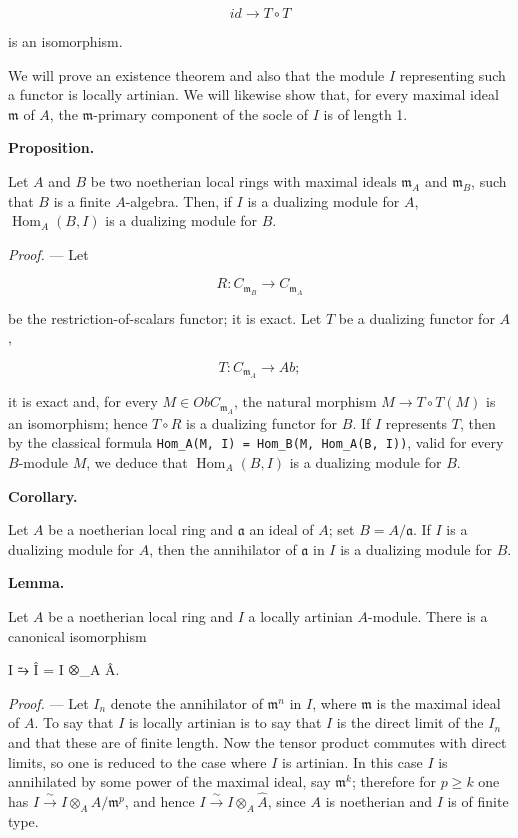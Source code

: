 \documentclass[
]{article}
\newenvironment{Shaded}{}{}
\newcommand{\NormalTok}[1]{#1}
\begin{document}
\[
id \longrightarrow T \circ T
\]

is an isomorphism.

We will prove an existence theorem and also that the module \(I\)
representing such a functor is locally artinian. We will likewise show
that, for every maximal ideal \(\mathfrak{m}\) of \(A\), the
\(\mathfrak{m}\)-primary component of the socle of \(I\) is of length 1.

\textbf{Proposition.}

Let \(A\) and \(B\) be two noetherian local rings with maximal ideals
\(\mathfrak{m}_{A}\) and \(\mathfrak{m}_{B}\), such that \(B\) is a
finite \(A\)-algebra. Then, if \(I\) is a dualizing module for \(A\),
\(\operatorname{Hom}_{A}(B, I)\) is a dualizing module for \(B\).

\emph{Proof.} --- Let

\[
R : C_{\mathfrak{m}_{B}} \longrightarrow C_{\mathfrak{m}_{A}}
\]

be the restriction-of-scalars functor; it is exact. Let \(T\) be a
dualizing functor for \(A\),

\[
T : C_{\mathfrak{m}_{A}} \longrightarrow Ab;
\]

it is exact and, for every \(M \in Ob C_{\mathfrak{m}_{A}}\), the
natural morphism \(M \to T \circ T(M)\) is an isomorphism; hence
\(T \circ R\) is a dualizing functor for \(B\). If \(I\) represents
\(T\), then by the classical formula
\texttt{Hom\_A(M,\ I)\ =\ Hom\_B(M,\ Hom\_A(B,\ I))}, valid for every
\(B\)-module \(M\), we deduce that \(\operatorname{Hom}_{A}(B, I)\) is a
dualizing module for \(B\).

\textbf{Corollary.}

Let \(A\) be a noetherian local ring and \(\mathfrak{a}\) an ideal of
\(A\); set \(B = A/\mathfrak{a}\). If \(I\) is a dualizing module for
\(A\), then the annihilator of \(\mathfrak{a}\) in \(I\) is a dualizing
module for \(B\).

\textbf{Lemma.}

Let \(A\) be a noetherian local ring and \(I\) a locally artinian
\(A\)-module. There is a canonical isomorphism

\begin{Shaded}
\begin{Highlighting}[]
\NormalTok{I ⥲ Î = I ⊗\_A Â.}
\end{Highlighting}
\end{Shaded}

\emph{Proof.} --- Let \(I_{n}\) denote the annihilator of
\(\mathfrak{m}^{n}\) in \(I\), where \(\mathfrak{m}\) is the maximal
ideal of \(A\). To say that \(I\) is locally artinian is to say that
\(I\) is the direct limit of the \(I_{n}\) and that these are of finite
length. Now the tensor product commutes with direct limits, so one is
reduced to the case where \(I\) is artinian. In this case \(I\) is
annihilated by some power of the maximal ideal, say
\(\mathfrak{m}^{k}\); therefore for \(p \geqslant k\) one has
\(I \xrightarrow{\sim} I \otimes_{A} A/\mathfrak{m}^{p}\), and hence
\(I \xrightarrow{\sim} I \otimes_{A} \hat{A}\), since \(A\) is
noetherian and \(I\) is of finite type.
\end{document}
